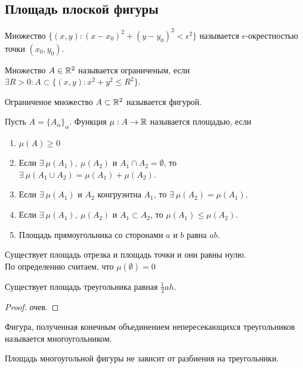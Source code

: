 \subsection{Площадь плоской фигуры}
\begin{definition}
    Множество $\{(x,y): (x-x_0)^2+(y-y_0)^2<\epsilon^2\}$ называется $\epsilon$-окрестностью точки $(x_0,y_0)$.
\end{definition}
\begin{definition}
    Множество $A\in \mathbb{R}^2$ называется ограниченым, если $\exists R>0: A\subset \{(x,y): x^2+y^2\leq R^2\}$.
\end{definition}  
\begin{definition}
    Ограниченое множество $A\subset \mathbb{R}^2$ называется фигурой.
\end{definition} 
\begin{definition}
    Пусть $A=\{A_{\alpha}\}_{\alpha}$. Функция $\mu: A\to \mathbb{R}$ называется площадью, если 
    \begin{enumerate}
        \item $\mu(A)\geq 0$
        \item Если $\exists\ \mu(A_1),\ \mu(A_2)$ и $A_1\cap A_2 =\emptyset$, то $\exists\ \mu(A_1 \cup A_2)=\mu(A_1)+\mu(A_2)$.
        \item Если $\exists\ \mu(A_1)$ и $A_2$ конгруэнтна $A_1$, то $\exists\ \mu(A_2)=\mu(A_1)$.
        \item Если $\exists\ \mu(A_1),\ \mu(A_2)$ и $A_1\subset A_2$, то $\mu(A_1)\leq \mu(A_2)$.
        \item Площадь прямоугольника со сторонами $a$ и $b$ равна $ab$.
    \end{enumerate}
\end{definition} 
\begin{comm}
    Существует площадь отрезка и площадь точки и они равны нулю.\\
    По определению считаем, что $\mu(\emptyset)=0$
\end{comm} 
\begin{statement}
    Существует площадь треугольника равная $\frac{1}{2}ah$.
\end{statement} 
\begin{proof}
    очев.
\end{proof} 
\begin{definition}
    Фигура, полученная конечным объединением непересекающихся треугольников называется многоугольником.
\end{definition} 
\begin{theorem}
    Площадь многоугольной фигуры не зависит от разбиения на треугольники.
\end{theorem} 
